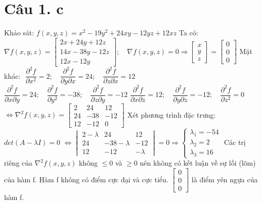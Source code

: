 \documentclass[11pt]{article}
\begin{document}
\section*{Câu 1. c}
Khảo sát: $ f(x, y, z) =  x^2 - 19y^2 + 24xy - 12yz + 12xz $
\newline Ta có: $ \nabla f(x, y, z) = \begin{bmatrix}
    2x + 24y + 12z \\
    14x - 38y - 12z \\
    12x - 12y
\end{bmatrix}; \quad \nabla f(x, y, z) = 0 \Rightarrow \begin{bmatrix}
    x \\ y \\ z
\end{bmatrix} = \begin{bmatrix}
    0 \\
    0 \\
    0
\end{bmatrix} $
\newline Mặt khác: $ $
\newline $ \dfrac{\partial^2 f}{\partial x^2} = 2; \quad \dfrac{\partial^2 f}{\partial y \partial x} = 24; \quad \dfrac{\partial^2 f}{\partial z \partial x} = 12 $
\newline $ \dfrac{\partial^2 f}{\partial x \partial y} = 24; \quad \dfrac{\partial^2 f}{\partial y^2} = -38; \quad \dfrac{\partial^2 f}{\partial z \partial y} = -12 $
\newline $ \dfrac{\partial^2 f}{\partial x \partial z} = 12; \quad \dfrac{\partial^2 f}{\partial y \partial z} = -12; \quad \dfrac{\partial^2 f}{\partial z^2} = 0 $
\newline $ \Leftrightarrow \nabla^2 f(x, y, z) = \begin{bmatrix}
    2 & 24 & 12 \\
    24 & -38 & -12 \\
    12 & -12 & 0
\end{bmatrix} $
\newline Xét phương trình đặc trưng: $ det(A - \lambda I) = 0 $
\newline $ \Leftrightarrow \begin{vmatrix}
    2 - \lambda & 24 & 12 \\
    24 & -38 - \lambda & -12 \\
    12 & -12 & - \lambda
\end{vmatrix} = 0 \Rightarrow \begin{cases}
    \lambda_1 = -54 \\
    \lambda_2 = 2 \\
    \lambda_3 = 16
\end{cases} $
\newline Các trị riêng của $ \nabla^2 f(x, y, z) $ không $ \le 0 $ và $ \ge 0 $ nên không có kết luận về sự lồi (lõm) của hàm f.
\newline Hàm f không có điểm cực đại và cực tiểu. $ \begin{bmatrix}
    0 \\ 0 \\ 0
\end{bmatrix} $ là điểm yên ngựa của hàm f.
\end{document}
